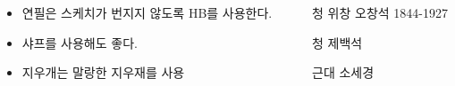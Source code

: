 \documentclass[	20pt, 
							a0paper, 
							landscape, %
							margin=0mm, %
							innermargin=4mm,  		%
							blockverticalspace=4mm, %
							colspace=5mm, 
							subcolspace=0mm
							]{tikzposter}
\begin{document}
\begin{columns}
{			\begin{LARGE}
			\begin{itemize}
			\item 연필은 스케치가 번지지 않도록 HB를 사용한다. 
			\item 샤프를 사용해도 좋다.
			\item 지우개는 말랑한 지우재를  사용
			\end{itemize}
			\end{LARGE}
		}
























		{
			\setlength{\leftmargini}{4em}			
			\setlength{\labelsep}{1em} %

			\begin{LARGE}
			\begin{itemize}
			\item [청] 위창 오창석 1844-1927
			\item [청] 제백석
			\item [근대] 소세경
			\end{itemize}
			\end{LARGE}

}
\end{columns}
\end{document}
